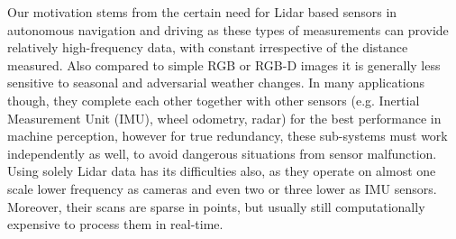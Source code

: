 \documentclass[letterpaper, 10 pt, conference]{ieeeconf}  %
\begin{document}
Our motivation stems from the certain need for Lidar based sensors in autonomous navigation and driving as these types of measurements can provide relatively high-frequency data, with constant irrespective of the distance measured. Also compared to simple RGB or RGB-D images it is generally less sensitive to seasonal and adversarial weather changes. In many applications though, they complete each other together with other sensors (e.g. Inertial Measurement Unit (IMU), wheel odometry, radar) for the best performance in machine perception, however for true redundancy, these sub-systems must work independently as well, to avoid dangerous situations from sensor malfunction. Using solely Lidar data has its difficulties also, as they operate on almost one scale lower frequency as cameras and even two or three lower as IMU sensors. Moreover, their scans are sparse in points, but usually still computationally expensive to process them in real-time.

\end{document}
